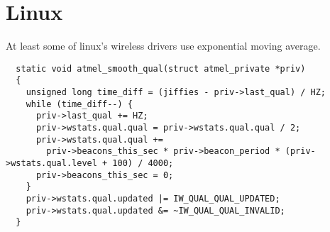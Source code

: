 \documentclass[10pt,a4paper]{article}
\begin{document}
\section{Linux}

At least some of linux's wireless drivers use exponential moving average.

\begin{verbatim}
  static void atmel_smooth_qual(struct atmel_private *priv)
  {
    unsigned long time_diff = (jiffies - priv->last_qual) / HZ;
    while (time_diff--) {
      priv->last_qual += HZ;
      priv->wstats.qual.qual = priv->wstats.qual.qual / 2;
      priv->wstats.qual.qual +=
        priv->beacons_this_sec * priv->beacon_period * (priv->wstats.qual.level + 100) / 4000;
      priv->beacons_this_sec = 0;
    }
    priv->wstats.qual.updated |= IW_QUAL_QUAL_UPDATED;
    priv->wstats.qual.updated &= ~IW_QUAL_QUAL_INVALID;
  }
\end{verbatim}
\end{document}

